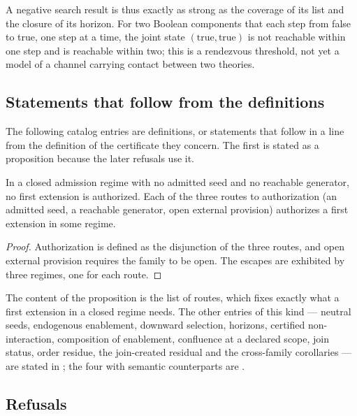 A negative search result is thus exactly as strong as the coverage of its list and the
closure of its horizon. For two Boolean components that each step from false to true, one step
at a time, the joint state $(\text{true},\text{true})$ is not reachable within one step and is
reachable within two; this is a rendezvous threshold, not yet a model of a channel carrying
contact between two theories.

\subsection{Statements that follow from the definitions}
\label{sec:sep-definitional}

The following catalog entries are definitions, or statements that follow in a line from
the definition of the certificate they concern. The first is stated as a proposition
because the later refusals use it.

\begin{proposition}[Bootstrap]
\label{prop:bootstrap}
In a closed admission regime with no admitted seed and no reachable generator, no first
extension is authorized. Each of the three routes to authorization (an admitted seed, a
reachable generator, open external provision) authorizes a first extension in some
regime.
\end{proposition}

\begin{proof}
Authorization is defined as the disjunction of the three routes, and open external
provision requires the family to be open. The escapes are exhibited by three regimes, one
for each route.
\end{proof}

The content of the proposition is the list of routes, which fixes exactly what a first
extension in a closed regime needs. The other entries of this kind --- neutral seeds, endogenous
enablement, downward selection, horizons, certified non-interaction, composition of enablement,
confluence at a declared scope, join status, order residue, the join-created residual and the
cross-family corollaries --- are stated in ; the four with semantic
counterparts are .

\subsection{Refusals}
\label{sec:sep-refusals}


